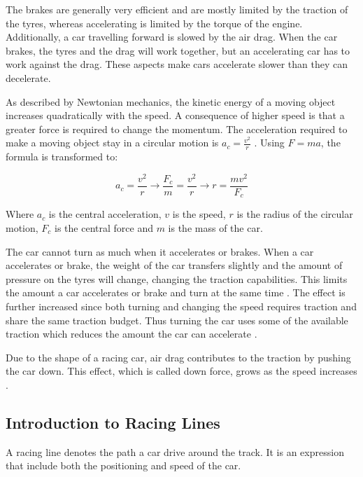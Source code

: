 The brakes are generally very efficient and are mostly limited by the traction of the tyres, whereas accelerating is limited by the torque of the engine. Additionally, a car travelling forward is slowed by the air drag. When the car brakes, the tyres and the drag will work together, but an accelerating car has to work against the drag. These aspects make cars accelerate slower than they can decelerate.

As described by Newtonian mechanics, the kinetic energy of a moving object increases quadratically with the speed. A consequence of higher speed is that a greater force is required to change the momentum. The acceleration required to make a moving object stay in a circular motion is \(a_c=\frac{v^2}{r}\)  \cite{beckman}. Using \(F=ma\), the formula is transformed to: 

\begin{equation}
\label{equation:turn_radius}
a_c = \frac{v^2}{r} 
\rightarrow
\frac{F_c}{m} = \frac{v^2}{r} 
\rightarrow
r = \frac{mv^2}{F_c}
\end{equation}

\noindent
Where $a_c$ is the central acceleration, $v$ is the speed, $r$ is the radius of the circular motion, $F_c$ is the central force and $m$ is the mass of the car. 

The car cannot turn as much when it accelerates or brakes. When a car accelerates or brake, the weight of the car transfers slightly and the amount of pressure on the tyres will change, changing the traction capabilities. This limits the amount a car accelerates or brake and turn at the same time \cite{beckman}. The effect is further increased since both turning and changing the speed requires traction and share the same traction budget. Thus turning the car uses some of the available traction which reduces the amount the car can accelerate \cite{beckman, edmondson}. 


Due to the shape of a racing car, air drag contributes to the traction by pushing the car down. This effect, which is called down force, grows as the speed increases \cite{beckman}.

\subsection{Introduction to Racing Lines}
\label{racing_theory:lines}
A racing line denotes the path a car drive around the track. It is an expression that include both the positioning and speed of the car.

